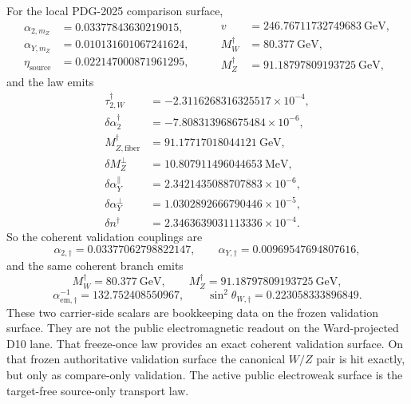 \documentclass[11pt]{article}
\begin{document}
For the local PDG-2025 comparison surface,
\[
\begin{aligned}
\alpha_{2,m_Z}&=0.03377843630219015,\\
\alpha_{Y,m_Z}&=0.010131601067241624,\\
\eta_{\mathrm{source}}&=0.022147000871961295,
\end{aligned}
\qquad
\begin{aligned}
v&=246.76711732749683~\mathrm{GeV},\\
M_W^\dagger&=80.377~\mathrm{GeV},\\
M_Z^\dagger&=91.18797809193725~\mathrm{GeV},
\end{aligned}
\]
and the law emits
\[
\begin{aligned}
\tau_{2,W}^\dagger&=-2.3116268316325517\times10^{-4},\\
\delta\alpha_2^\dagger&=-7.808313968675484\times10^{-6},\\
M_{Z,\mathrm{fiber}}^\dagger&=91.17717018044121~\mathrm{GeV},\\
\delta M_Z^\perp&=10.807911496044653~\mathrm{MeV},\\
\delta\alpha_Y^\parallel&=2.3421435088707883\times10^{-6},\\
\delta\alpha_Y^\perp&=1.0302892666790446\times10^{-5},\\
\delta n^\dagger&=2.3463639031113336\times10^{-4}.
\end{aligned}
\]
So the coherent validation couplings are
\[
\alpha_{2,\dagger}=0.03377062798822147,
\qquad
\alpha_{Y,\dagger}=0.00969547694807616,
\]
and the same coherent branch emits
\[
M_W^\dagger=80.377~\mathrm{GeV},
\qquad
M_Z^\dagger=91.18797809193725~\mathrm{GeV},
\]
\[
\alpha_{\mathrm{em},\dagger}^{-1}=132.752408550967,
\qquad
\sin^2\theta_{W,\dagger}=0.223058333896849.
\]
These two carrier-side scalars are bookkeeping data on the frozen validation surface. They are not
the public electromagnetic readout on the Ward-projected D10 lane.
That freeze-once law provides an exact coherent validation surface. On that frozen authoritative
validation surface the canonical \(W/Z\) pair is hit exactly, but only as compare-only validation.
The active public electroweak surface is the target-free source-only transport law.
\end{document}

